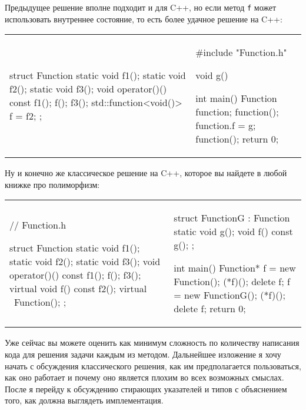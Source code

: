Предыдущее решение вполне подходит и для C++, но если метод \texttt{f} может использовать внутреннее состояние, то есть более удачное решение на C++:
\begin{center}
\begin{tabular}{ll}
{
\begin{minipage}[\baselineskip]{5.5cm}
\begin{cppcode}[numbers = none, linewidth=5.5cm]
struct Function {
  static void f1();
  static void f2();
  static void f3();
  void operator()() const {
    f1();
    f();
    f3();
  }
  std::function<void()> f = f2;
};
\end{cppcode}
\end{minipage}
}&{
\begin{minipage}[\baselineskip]{5cm}
\begin{cppcode}[numbers = none, linewidth=5cm]
#include "Function.h"

void g() {}

int main() {
  Function function;
  function();
  function.f = g;
  function();
  return 0;
}
\end{cppcode}
\end{minipage}
}
\end{tabular}
\end{center}
Ну и конечно же классическое решение на C++, которое вы найдете в любой книжке про полиморфизм:
\begin{center}
\begin{tabular}{ll}
{
\begin{minipage}[\baselineskip]{5cm}
\begin{cppcode}[numbers = none, linewidth=5cm]
// Function.h

struct Function {
  static void f1();
  static void f2();
  static void f3();
  void operator()() const {
    f1();
    f();
    f3();
  }
  virtual void f() const {
    f2();
  }
  virtual ~Function();
};
\end{cppcode}
\end{minipage}
}&{
\begin{minipage}[\baselineskip]{5.5cm}
\begin{cppcode}[numbers = none, linewidth=5.5cm]
struct FunctionG : Function {
  static void g();
  void f() const {
    g();
  }
};

int main() {
  Function* f = new Function();
  (*f)();
  delete f;
  f = new FunctionG();
  (*f)();
  delete f;
  return 0;
}
\end{cppcode}
\end{minipage}
}
\end{tabular}
\end{center}
Уже сейчас вы можете оценить как минимум сложность по количеству написания кода для решения задачи каждым из методом.
Дальнейшее изложение я хочу начать с обсуждения классического решения, как им предполагается пользоваться, как оно работает и почему оно является плохим во всех возможных смыслах.
После я перейду к обсуждению стирающих указателей и типов с объяснением того, как должна выглядеть имплементация.


